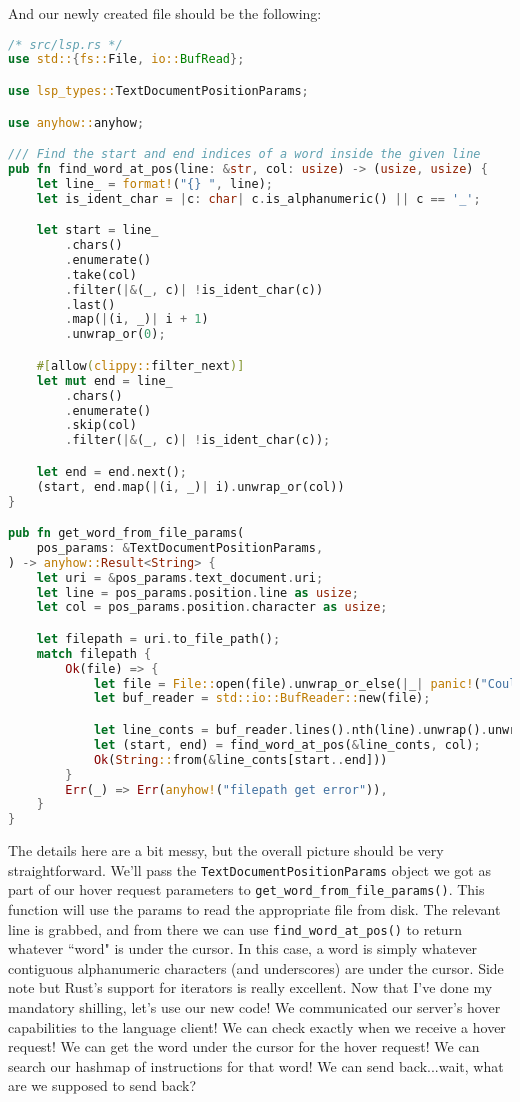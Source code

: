 And our newly created file should be the following:

\begin{lstlisting}[language=rust]
/* src/lsp.rs */
use std::{fs::File, io::BufRead};

use lsp_types::TextDocumentPositionParams;

use anyhow::anyhow;

/// Find the start and end indices of a word inside the given line
pub fn find_word_at_pos(line: &str, col: usize) -> (usize, usize) {
    let line_ = format!("{} ", line);
    let is_ident_char = |c: char| c.is_alphanumeric() || c == '_';

    let start = line_
        .chars()
        .enumerate()
        .take(col)
        .filter(|&(_, c)| !is_ident_char(c))
        .last()
        .map(|(i, _)| i + 1)
        .unwrap_or(0);

    #[allow(clippy::filter_next)]
    let mut end = line_
        .chars()
        .enumerate()
        .skip(col)
        .filter(|&(_, c)| !is_ident_char(c));

    let end = end.next();
    (start, end.map(|(i, _)| i).unwrap_or(col))
}

pub fn get_word_from_file_params(
    pos_params: &TextDocumentPositionParams,
) -> anyhow::Result<String> {
    let uri = &pos_params.text_document.uri;
    let line = pos_params.position.line as usize;
    let col = pos_params.position.character as usize;

    let filepath = uri.to_file_path();
    match filepath {
        Ok(file) => {
            let file = File::open(file).unwrap_or_else(|_| panic!("Couldn't open file -> {}", uri));
            let buf_reader = std::io::BufReader::new(file);

            let line_conts = buf_reader.lines().nth(line).unwrap().unwrap();
            let (start, end) = find_word_at_pos(&line_conts, col);
            Ok(String::from(&line_conts[start..end]))
        }
        Err(_) => Err(anyhow!("filepath get error")),
    }
}
\end{lstlisting}

The details here are a bit messy, but the overall picture should be very straightforward. We'll pass the \texttt{TextDocumentPositionParams} object we got as part of our hover request parameters to \texttt{get\_word\_from\_file\_params()}. This function will use the params to read the appropriate file from disk. The relevant line is grabbed, and from there we can use \texttt{find\_word\_at\_pos()} to return whatever ``word" is under the cursor. In this case, a word is simply whatever contiguous alphanumeric characters (and underscores) are under the cursor. Side note but Rust's support for iterators is really excellent. Now that I've done my mandatory shilling, let's use our new code! We communicated our server's hover capabilities to the language client! We can check exactly when we receive a hover request! We can get the word under the cursor for
the hover request! We can search our hashmap of instructions for that word! We can send back...wait, what are we supposed to send back?

